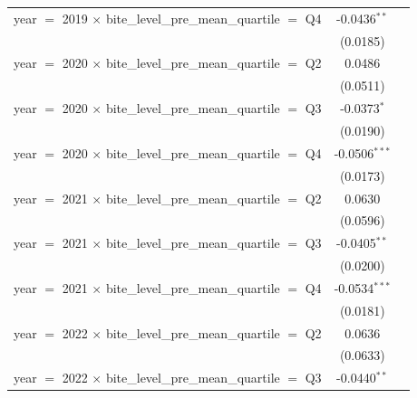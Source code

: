 \begin{tabular}{lcc}
   year $=$ 2019 $\times$ bite\_level\_pre\_mean\_quartile $=$ Q4             & -0.0436$^{**}$           &   \\   
                                                                              & (0.0185)                 &   \\   
   year $=$ 2020 $\times$ bite\_level\_pre\_mean\_quartile $=$ Q2             & 0.0486                   &   \\   
                                                                              & (0.0511)                 &   \\   
   year $=$ 2020 $\times$ bite\_level\_pre\_mean\_quartile $=$ Q3             & -0.0373$^{*}$            &   \\   
                                                                              & (0.0190)                 &   \\   
   year $=$ 2020 $\times$ bite\_level\_pre\_mean\_quartile $=$ Q4             & -0.0506$^{***}$          &   \\   
                                                                              & (0.0173)                 &   \\   
   year $=$ 2021 $\times$ bite\_level\_pre\_mean\_quartile $=$ Q2             & 0.0630                   &   \\   
                                                                              & (0.0596)                 &   \\   
   year $=$ 2021 $\times$ bite\_level\_pre\_mean\_quartile $=$ Q3             & -0.0405$^{**}$           &   \\   
                                                                              & (0.0200)                 &   \\   
   year $=$ 2021 $\times$ bite\_level\_pre\_mean\_quartile $=$ Q4             & -0.0534$^{***}$          &   \\   
                                                                              & (0.0181)                 &   \\   
   year $=$ 2022 $\times$ bite\_level\_pre\_mean\_quartile $=$ Q2             & 0.0636                   &   \\   
                                                                              & (0.0633)                 &   \\   
   year $=$ 2022 $\times$ bite\_level\_pre\_mean\_quartile $=$ Q3             & -0.0440$^{**}$           &   \\   

\end{tabular}
